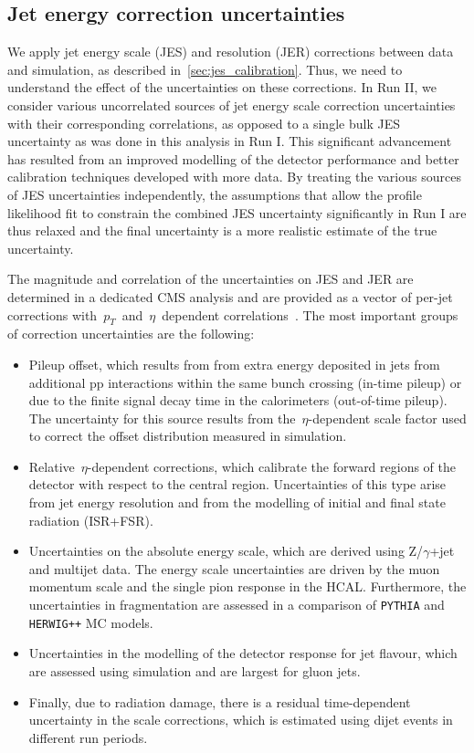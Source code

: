 \subsection{Jet energy correction uncertainties}
\label{sec:jec_unc}
We apply jet energy scale (JES) and resolution (JER) corrections between data and simulation, as described in~\cref{sec:jes_calibration}. Thus, we need to understand the effect of the uncertainties on these corrections. In Run II, we consider various uncorrelated sources of jet energy scale correction uncertainties with their corresponding correlations, as opposed to a single bulk JES uncertainty as was done in this analysis in Run I. This significant advancement has resulted from an improved modelling of the detector performance and better calibration techniques developed with more data. By treating the various sources of JES uncertainties independently, the assumptions that allow the profile likelihood fit to constrain the combined JES uncertainty significantly in Run I are thus relaxed and the final uncertainty is a more realistic estimate of the true uncertainty.

The magnitude and correlation of the uncertainties on JES and JER are determined in a dedicated CMS analysis and are provided as a vector of per-jet corrections with~$p_T$~and~$\eta$~dependent correlations~\cite{cms_jec_2017}. The most important groups of correction uncertainties are the following:

\begin{itemize}
\item Pileup offset, which results from from extra energy deposited in jets from additional pp interactions within the same bunch crossing (in-time pileup) or due to the finite signal decay time in the calorimeters (out-of-time pileup). The uncertainty for this source results from the~$\eta$-dependent scale factor used to correct the offset distribution measured in simulation.
\item Relative~$\eta$-dependent corrections, which calibrate the forward regions of the detector with respect to the central region. Uncertainties of this type arise from jet energy resolution and from the modelling of initial and final state radiation (ISR+FSR).
\item Uncertainties on the absolute energy scale, which are derived using Z/$\gamma$+jet and multijet data. The energy scale uncertainties are driven by the muon momentum scale and the single pion response in the HCAL. Furthermore, the uncertainties in fragmentation are assessed in a comparison of \texttt{PYTHIA} and \texttt{HERWIG++} MC models.
\item Uncertainties in the modelling of the detector response for jet flavour, which are assessed using simulation and are largest for gluon jets.
\item Finally, due to radiation damage, there is a residual time-dependent uncertainty in the scale corrections, which is estimated using dijet events in different run periods.
\end{itemize}

